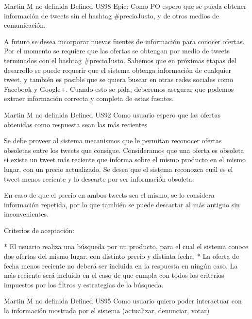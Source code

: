 	{} %
	{} %
	{Martin M} %
	{no definida} %
	{Defined} %
\userStory
	{US98} %
	{Epic: Como PO espero que se pueda obtener información de tweets sin el hashtag #precioJusto, y de otros medios de comunicación.} %
	{A futuro se desea incorporar nuevas fuentes de información para conocer
ofertas. Por el momento se requiere que las ofertas se obtengan por medio de
tweets terminados con el hashtag #precioJusto. Sabemos que en próximas etapas
del desarrollo se puede requerir que el sistema obtenga información de
cualquier tweet, y también es posible que se quiera buscar en otras redes
sociales como Facebook y Google+. Cuando esto se pida, deberemos asegurar que
podemos extraer información correcta y completa de estas fuentes.

} %
	{} %
	{} %
	{Martin M} %
	{no definida} %
	{Defined} %
\userStory
	{US92} %
	{Como usuario espero que las ofertas obtenidas como respuesta sean las más recientes} %
	{Se debe proveer al sistema mecanismos que le permitan reconocer ofertas
obsoletas entre los tweets que consigue. Consideramos que una oferta es
obsoleta si existe un tweet más reciente que informa sobre el mismo producto
en el mismo lugar, con un precio actualizado. Se desea que el sistema
reconozca cuál es el tweet menos reciente y lo descarte por ser información
obsoleta.

En caso de que el precio en ambos tweets sea el mismo, se lo considera
información repetida, por lo que también se puede descartar al más antiguo sin
inconvenientes.

  
Criterios de aceptación:

* El usuario realiza una búsqueda por un producto, para el cual el sistema conoce dos ofertas del mismo lugar, con distinto precio y distinta fecha.  
* La oferta de fecha menos reciente no deberá ser incluida en la respuesta en ningún caso. La más reciente será incluida en el caso de que cumpla con todos los criterios impuestos por los filtros y estrategias de la búsqueda.

} %
	{} %
	{} %
	{Martin M} %
	{no definida} %
	{Defined} %
\userStory
	{US95} %
	{Como usuario quiero poder interactuar con la información mostrada por el sistema (actualizar, denunciar, votar)} %
